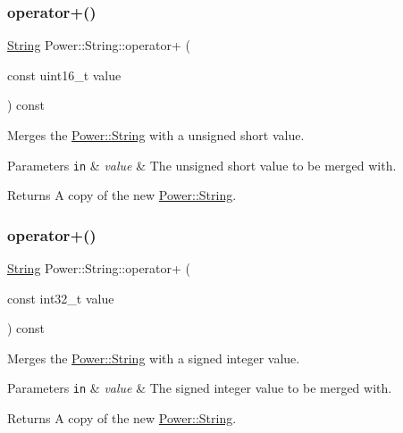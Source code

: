 \subsubsection{\texorpdfstring{operator+()}{operator+()}\hspace{0.1cm}{\footnotesize\ttfamily [5/11]}}
{\footnotesize\ttfamily \hyperlink{class_power_1_1_string}{String} Power\+::\+String\+::operator+ (\begin{DoxyParamCaption}\item[{const uint16\+\_\+t}]{value }\end{DoxyParamCaption}) const\hspace{0.3cm}{\ttfamily [inline]}}



Merges the \hyperlink{class_power_1_1_string}{Power\+::\+String} with a unsigned short value. 


\begin{DoxyParams}[1]{Parameters}
\mbox{\tt in}  & {\em value} & The unsigned short value to be merged with. \\
\hline
\end{DoxyParams}
\begin{DoxyReturn}{Returns}
A copy of the new \hyperlink{class_power_1_1_string}{Power\+::\+String}. 
\end{DoxyReturn}
\mbox{\label{class_power_1_1_string_ac2eab190a121d5b7dc4431ea22966b7e}} 
\subsubsection{\texorpdfstring{operator+()}{operator+()}\hspace{0.1cm}{\footnotesize\ttfamily [6/11]}}
{\footnotesize\ttfamily \hyperlink{class_power_1_1_string}{String} Power\+::\+String\+::operator+ (\begin{DoxyParamCaption}\item[{const int32\+\_\+t}]{value }\end{DoxyParamCaption}) const\hspace{0.3cm}{\ttfamily [inline]}}



Merges the \hyperlink{class_power_1_1_string}{Power\+::\+String} with a signed integer value. 


\begin{DoxyParams}[1]{Parameters}
\mbox{\tt in}  & {\em value} & The signed integer value to be merged with. \\
\hline
\end{DoxyParams}
\begin{DoxyReturn}{Returns}
A copy of the new \hyperlink{class_power_1_1_string}{Power\+::\+String}. 
\end{DoxyReturn}
\mbox{\label{class_power_1_1_string_afc7e926554a6e77bd4e34e850f08fa35}} 
